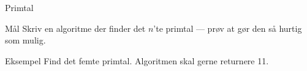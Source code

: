 \documentclass[12pt,t]{beamer}
\begin{document}
    \begin{frame}{Primtal}
      \begin{block}{Mål}
      Skriv en algoritme der finder det $n$'te primtal --- prøv at gør den så
      hurtig som mulig.
      \end{block}
      \pause

      \begin{exampleblock}{Eksempel}
      Find det femte primtal. Algoritmen skal gerne returnere 11.
      \end{exampleblock}
    \end{frame}
\end{document}
